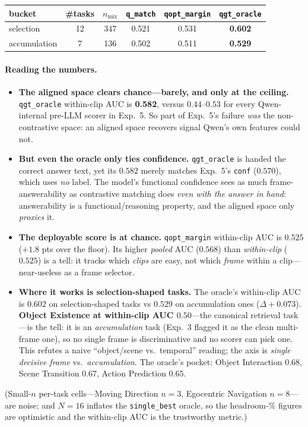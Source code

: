 \documentclass[11pt]{article}
\begin{document}
\begin{center}
\begin{tabular}{lccccc}
\toprule
bucket & \#tasks & $n_{\mathrm{mix}}$ & \texttt{q\_match} & \texttt{qopt\_margin} & \texttt{qgt\_oracle} \\
\midrule
selection    & 12 & 347 & 0.521 & 0.531 & \textbf{0.602} \\
accumulation &  7 & 136 & 0.502 & 0.511 & \textbf{0.529} \\
\bottomrule
\end{tabular}
\end{center}

\paragraph{Reading the numbers.}
\begin{itemize}
\item \textbf{The aligned space clears chance---barely, and only at the ceiling.}
      \texttt{qgt\_oracle} within-clip AUC is \textbf{0.582}, versus $0.44$--$0.53$ for every
      Qwen-internal pre-LLM scorer in Exp.~5. So part of Exp.~5's failure \emph{was} the
      non-contrastive space: an aligned space recovers signal Qwen's own features could not.
\item \textbf{But even the oracle only ties confidence.} \texttt{qgt\_oracle} is handed the
      correct answer text, yet its $0.582$ merely matches Exp.~5's \texttt{conf} ($0.570$),
      which uses \emph{no} label. The model's functional confidence sees as much
      frame-answerability as contrastive matching does \emph{even with the answer in hand}:
      answerability is a functional/reasoning property, and the aligned space only
      \emph{proxies} it.
\item \textbf{The deployable score is at chance.} \texttt{qopt\_margin} within-clip AUC is
      $0.525$ ($+1.8$ pts over the floor). Its higher \emph{pooled} AUC ($0.568$) than
      \emph{within-clip} ($0.525$) is a tell: it tracks which \emph{clips} are easy, not which
      \emph{frame} within a clip---near-useless as a frame selector.
\item \textbf{Where it works is selection-shaped tasks.} The oracle's within-clip AUC is
      $0.602$ on selection-shaped tasks vs $0.529$ on accumulation ones ($\Delta+0.073$).
      \textbf{Object Existence at within-clip AUC $0.50$}---the canonical retrieval task---is
      the tell: it is an \emph{accumulation} task (Exp.~3 flagged it as the clean multi-frame
      one), so no single frame is discriminative and no scorer can pick one. This refutes a
      naive ``object/scene vs.\ temporal'' reading; the axis is \emph{single decisive frame}
      vs.\ \emph{accumulation}. The oracle's pocket: Object Interaction $0.68$, Scene
      Transition $0.67$, Action Prediction $0.65$.
\end{itemize}
(Small-$n$ per-task cells---Moving Direction $n{=}3$, Egocentric Navigation $n{=}8$---are
noise; and $N{=}16$ inflates the \texttt{single\_best} oracle, so the headroom-\% figures are
optimistic and the within-clip AUC is the trustworthy metric.)
\end{document}
